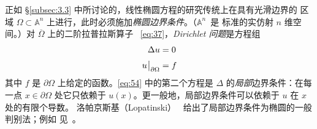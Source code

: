 \documentclass[11pt]{amsart}
\theoremstyle{definition}
\theoremstyle{remark}
\theoremstyle{plain}
\numberwithin{equation}{section}
\renewcommand{\:}{\colon}
\renewcommand{\AA}{{\mathbb A}}
\DeclareRobustCommand{\mstrut}{^{\vphantom{1*\prime y\vee M}}}
\newcommand{\res}[1]{\negmedspace\bigm|\mstrut_{#1}}
\begin{document}
正如 \S\ref{subsec:3.3} 中所讨论的，线性椭圆方程的研究传统上在具有光滑边界的
区域 $\Omega \subset \AA^n$ 上进行，此时必须施加\emph{椭圆边界条件}。（$\AA^n$~是
标准的实仿射 $n$ 维空间。）对 $\overline{\Omega }$ 上的二阶拉普拉斯算子
~\eqref{eq:37}，\emph{Dirichlet 问题}是方程组
  \begin{equation}\label{eq:54}
     \begin{aligned} \Delta u&=0 \\ u\res{\partial \Omega }&=f\end{aligned} 
  \end{equation}
其中 $f$ 是 $\partial \Omega $ 上给定的函数。\eqref{eq:54} 中的第二个方程是
$\Delta $ 的\emph{局部}边界条件：在每一点 $x\in \partial \Omega $ 处它只依赖于
$u(x)$。更一般地，局部边界条件可以依赖于 $u$ 在 $x$ 处的有限个导数。
洛帕京斯基（Lopatinski）~\cite{Lo} 给出了局部边界条件为椭圆的一般判别法；例如
见~\cite[\S20.1]{Ho1}。
\end{document}
